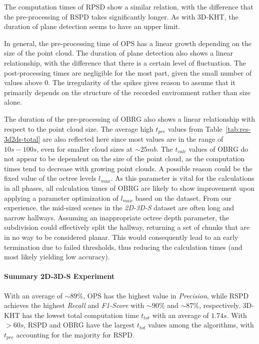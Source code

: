 \documentclass[main.tex]{subfiles}
\begin{document}
The computation times of RPSD show a similar relation, with the difference that the pre-processing of RSPD takes significantly longer.
As with 3D-KHT, the duration of plane detection seems to have an upper limit.

In general, the pre-processing time of OPS has a linear growth depending on the size of the point cloud.
The duration of plane detection also shows a linear relationship, with the difference that there is a certain level
of fluctuation. The post-processing times are negligible for the most part, given the small number of values above $0$.
The irregularity of the spikes gives reason to assume that it primarily depends on the structure of the recorded
environment rather than size alone.

The duration of the pre-processing of OBRG also shows a linear relationship with respect to the point cloud size.
The average high $t_{pre}$ values from Table~\ref{tab:res-3d2ds-total} are also reflected here since most values are in the range of
$10s-100s$,
even for smaller cloud sizes at ${\sim}25mb$.
The $t_{calc}$ values of OBRG do not appear to be dependent on the size of the point cloud, as the computation
times tend to decrease with growing point clouds. A possible reason could be the fixed value of the octree levels $l_{max}$.
As this parameter is vital for the calculations in all phases, all calculation times of OBRG are likely to show improvement
upon applying a parameter optimization of $l_{max}$ based on the dataset. 
From our experience, the mid-sized scenes in the \textit{2D-3D-S} dataset are often long and narrow hallways. Assuming an inappropriate
octree depth parameter, the subdivision could effectively split the hallway, returning a set of chunks that are in no
way to be considered planar. This would consequently lead to an early termination due to failed thresholds, thus reducing
the calculation times (and most likely yielding low accuracy).

\paragraph{Summary 2D-3D-S Experiment}
\label{par:sumsdexp}
With an average of ${\sim}89\%$, OPS has the highest value in \textit{Precision}, while RSPD achieves the highest \textit{Recall}
and \textit{F1-Score} with ${\sim}90\%$ and ${\sim}87\%$, respectively.
3D-KHT has the lowest total computation time $t_{tot}$ with an average of $1.74s$. With ${>}60s$,
RSPD and OBRG have the largest $t_{tot}$ values among the algorithms, with $t_{pre}$ accounting for
the majority for RSPD.
\end{document}
